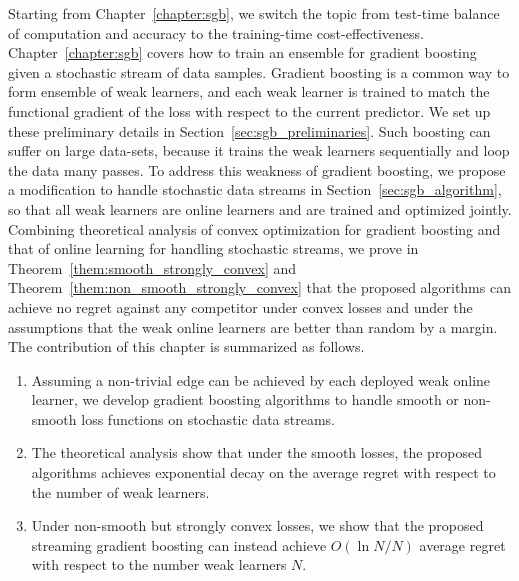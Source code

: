 Starting from Chapter~\ref{chapter:sgb}, we switch the topic from test-time balance of computation and accuracy to the training-time cost-effectiveness. Chapter~\ref{chapter:sgb} covers how to train an ensemble for gradient boosting given a stochastic stream of data samples. Gradient boosting is a common way to form ensemble of weak learners, and each weak learner is trained to match the functional gradient of the loss with respect to the current predictor. We set up these preliminary details in Section~\ref{sec:sgb_preliminaries}. Such boosting can suffer on large data-sets, because it trains the weak learners sequentially and loop the data many passes. To address this weakness of gradient boosting, we propose a modification to handle stochastic data streams in Section~\ref{sec:sgb_algorithm}, so that all weak learners are online learners and are trained and optimized jointly. Combining theoretical analysis of convex optimization for gradient boosting and that of online learning for handling stochastic streams, we prove in Theorem~\ref{them:smooth_strongly_convex} and Theorem~\ref{them:non_smooth_strongly_convex} that the proposed algorithms can achieve no regret against any competitor under convex losses and under the assumptions that the weak online learners are better than random by a margin. 
The contribution of this chapter is summarized as follows.

\begin{enumerate}[resume]
\item Assuming a non-trivial edge can be achieved by each deployed weak online learner, we develop gradient boosting algorithms to handle smooth or non-smooth loss functions on stochastic data streams.
\item The theoretical analysis show that under the smooth losses, 
the proposed algorithms achieves exponential decay on the average regret with respect to the number of weak learners. 
\item Under non-smooth but strongly convex losses, we show that the proposed streaming gradient boosting can instead achieve $O(\ln N/N)$ average regret with respect to the number weak learners $N$. 
\end{enumerate}

